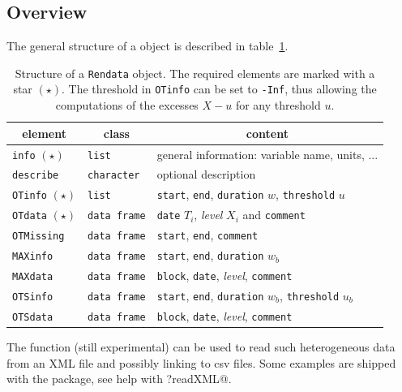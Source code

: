 \documentclass[a4paper]{report}
\begin{document}
\subsection{Overview}

The general structure of a \verb@Rendata@ object is described in
table~\ref{RENDATATAB}.

\begin{table}
  \centering
  \begin{tabular}{l l l }
    \toprule
    \multicolumn{1}{c}{element} & 
    \multicolumn{1}{c}{class} & 
    \multicolumn{1}{c}{content} \\ \toprule
    \texttt{info} $(\star)$   & \texttt{list}     & 
    general information: variable name, units, ...
    \\
    \texttt{describe}       & \texttt{character}  & optional description\\  \hline
    \texttt{OTinfo} $(\star)$ & \texttt{list}     & 
    \texttt{start}, \texttt{end}, \texttt{duration} $w$, \texttt{threshold} $u$\\
    \texttt{OTdata} $(\star)$ & \texttt{data frame} & 
    \texttt{date} $T_i$, \textit{level} $X_i$ and \texttt{comment} \\
    \texttt{OTMissing}      & \texttt{data frame} & 
     \texttt{start}, \texttt{end}, \texttt{comment} \\ \hline 
    \texttt{MAXinfo}        & \texttt{data frame} & 
    \texttt{start}, \texttt{end}, \texttt{duration} $w_b$\\
    \texttt{MAXdata}        & \texttt{data frame} & 
    \texttt{block}, \texttt{date}, \textit{level}, \texttt{comment}\\ \hline
    \texttt{OTSinfo}        & \texttt{data frame} & 
    \texttt{start}, \texttt{end}, \texttt{duration} $w_b$, \texttt{threshold} $u_b$
    \\
    \texttt{OTSdata}        & \texttt{data frame} & 
    \texttt{block}, \texttt{date}, \textit{level}, \texttt{comment}\\ \toprule
  \end{tabular}
  \caption{\label{RENDATATAB}
    Structure of a \texttt{Rendata} object. The required elements are marked 
    with a star $(\star)$. The threshold in \texttt{OTinfo} can be set to \texttt{-Inf},
    thus allowing the computations of the excesses $X - u$ for any threshold $u$.}
    
\end{table}

The \verb@readXML@ function (still experimental) can be used to read
such heterogeneous data from an XML file and possibly linking to csv files. Some
examples are shipped with the package, see help with \verb@?readXML@.
  
\end{document}
